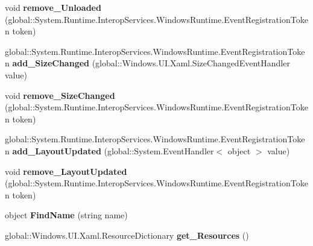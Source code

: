 \begin{DoxyCompactItemize}
void {\bfseries remove\+\_\+\+Unloaded} (global\+::\+System.\+Runtime.\+Interop\+Services.\+Windows\+Runtime.\+Event\+Registration\+Token token)
\item 
\mbox{\label{interface_windows_1_1_u_i_1_1_xaml_1_1_i_framework_element_abf3ac37a9daffc43b7299c8aa7b02e4a}} 
global\+::\+System.\+Runtime.\+Interop\+Services.\+Windows\+Runtime.\+Event\+Registration\+Token {\bfseries add\+\_\+\+Size\+Changed} (global\+::\+Windows.\+U\+I.\+Xaml.\+Size\+Changed\+Event\+Handler value)
\item 
\mbox{\label{interface_windows_1_1_u_i_1_1_xaml_1_1_i_framework_element_aee2c3dbe7e3702a98c8bff9f0c4720c0}} 
void {\bfseries remove\+\_\+\+Size\+Changed} (global\+::\+System.\+Runtime.\+Interop\+Services.\+Windows\+Runtime.\+Event\+Registration\+Token token)
\item 
\mbox{\label{interface_windows_1_1_u_i_1_1_xaml_1_1_i_framework_element_a25ade46d3420c73f6b9ca99a333bf905}} 
global\+::\+System.\+Runtime.\+Interop\+Services.\+Windows\+Runtime.\+Event\+Registration\+Token {\bfseries add\+\_\+\+Layout\+Updated} (global\+::\+System.\+Event\+Handler$<$ object $>$ value)
\item 
\mbox{\label{interface_windows_1_1_u_i_1_1_xaml_1_1_i_framework_element_ac054df7c36430442d26d3ce119295117}} 
void {\bfseries remove\+\_\+\+Layout\+Updated} (global\+::\+System.\+Runtime.\+Interop\+Services.\+Windows\+Runtime.\+Event\+Registration\+Token token)
\item 
\mbox{\label{interface_windows_1_1_u_i_1_1_xaml_1_1_i_framework_element_a07a0149f2dee5784c52807f935eb41d9}} 
object {\bfseries Find\+Name} (string name)
\item 
\mbox{\label{interface_windows_1_1_u_i_1_1_xaml_1_1_i_framework_element_aa9da62c1e38c8633cffa0cbd01a78dc6}} 
global\+::\+Windows.\+U\+I.\+Xaml.\+Resource\+Dictionary {\bfseries get\+\_\+\+Resources} ()
\item 

\end{DoxyCompactItemize}

